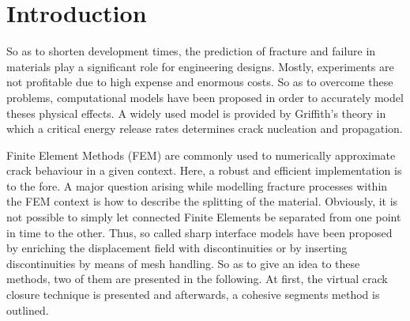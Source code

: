 \section{Introduction} \label{sec:intro}

So as to shorten development times, the prediction of fracture and failure in materials play a significant role for engineering designs. Mostly, experiments are not profitable due to high expense and enormous costs. So as to overcome these problems, computational models have been proposed in order to accurately model theses physical effects. A widely used model is provided by  Griffith's theory in which a critical energy release rates determines crack nucleation and propagation.

Finite Element Methods (FEM) are commonly used to numerically approximate crack behaviour in a given context. Here, a robust and efficient implementation is to the fore. A major question arising while modelling fracture processes within the FEM context is how to describe the splitting of the material. Obviously, it is not possible to simply let connected Finite Elements be separated from one point in time to the other. Thus, so called sharp interface models have been proposed by enriching the displacement field with discontinuities or by inserting discontinuities by means of mesh handling. So as to give an idea to these methods, two of them are presented in the following. At first, the virtual crack closure technique is presented and afterwards, a cohesive segments method is outlined.

